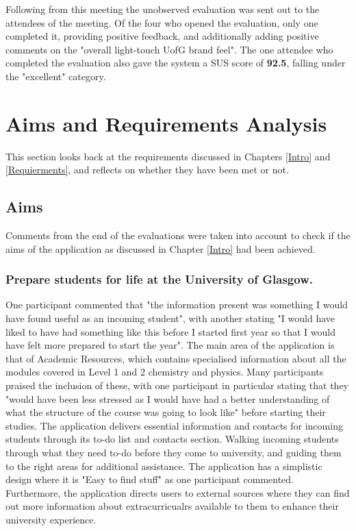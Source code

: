 \documentclass{l4proj}
\begin{document}
Following from this meeting the unobserved evaluation was sent out to the attendees of the meeting. Of the four who opened the evaluation,  only one completed it,  providing positive feedback,  and additionally adding positive comments on the "overall light-touch UofG brand feel". The one attendee who completed the evaluation also gave the system a SUS score of \textbf{92.5},  falling under the "excellent" category.

\section{Aims and Requirements Analysis}
This section looks back at the requirements discussed in Chapters \ref{Intro} and \ref{Requierments},  and reflects on whether they have been met or not.

\subsection{Aims}
Comments from the end of the evaluations were taken into account to check if the aims of the application as discussed in Chapter \ref{Intro} had been achieved.

\subsubsection{Prepare students for life at the University of Glasgow.}
One participant commented that "the information present was something I would have found useful as an incoming student",  with another stating "I would have liked to have had something like this before I started first year so that I would have felt more prepared to start the year". The main area of the application is that of Academic Resources,  which contains specialised information about all the modules covered in Level 1 and 2 chemistry and physics. Many participants praised the inclusion of these,  with one participant in particular stating that they "would have been less stressed as I would have had a better understanding of what the structure of the course was going to look like" before starting their studies. The application delivers essential information and contacts for incoming students through its to-do list and contacts section. Walking incoming students through what they need to-do before they come to university,  and guiding them to the right areas for additional assistance. The application has a simplistic design where it is "Easy to find stuff" as one participant commented. Furthermore,  the application directs users to external sources where they can find out more information about extracurricualrs available to them to enhance their university experience.
\end{document}
